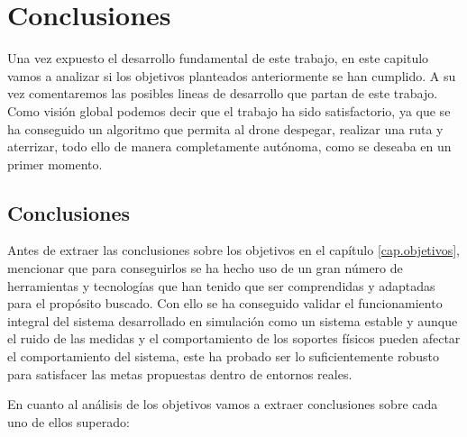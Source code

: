 \chapter{Conclusiones}\label{cap.conclusiones}
\hspace{1cm} Una vez expuesto el desarrollo fundamental de este trabajo, en este capitulo vamos a analizar si los objetivos planteados anteriormente se han cumplido. A su vez comentaremos las posibles lineas de desarrollo que partan de este trabajo. Como visión global podemos decir que el trabajo ha sido satisfactorio, ya que se ha conseguido un algoritmo que permita al drone despegar, realizar una ruta y aterrizar, todo ello de manera completamente autónoma, como se deseaba en un primer momento. 

\section{Conclusiones}
\hspace{1cm} Antes de extraer las conclusiones sobre los objetivos en el capítulo \ref{cap.objetivos}, mencionar que para conseguirlos se ha hecho uso de un gran número de herramientas y tecnologías que han tenido que ser comprendidas y adaptadas para el propósito buscado. Con ello se ha conseguido validar el funcionamiento integral del sistema desarrollado en simulación como un sistema estable y aunque el ruido de las medidas y el comportamiento de los soportes
físicos pueden afectar el comportamiento del sistema, este ha probado ser lo suficientemente
robusto para satisfacer las metas propuestas dentro de entornos reales.

\hspace{1cm} En cuanto al análisis de los objetivos vamos a extraer conclusiones sobre cada uno de ellos superado:

